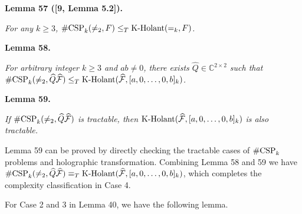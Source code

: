 

\par\medskip\noindent\textbf{
\textbf{Lemma 57}\textbf{ }([9, Lemma 5.2])\textbf{.}
}\par



\emph{For any $k\geq 3$, $\textup{{\#CSP}}_{k}(\neq_{2},F)\leq_{T}\textup{{K-Holant}}(=_{k},F)$.}\par







\par\medskip\noindent\textbf{
\textbf{Lemma 58}\textbf{.}
}\par



\emph{For arbitrary integer $k\geq 3$ and $ab\neq 0$, there exists $\widehat{Q}\in\mathbb{C}^{2\times 2}$ such that $\textup{{\#CSP}}_{k}(\neq_{2},\widehat{Q}\widehat{\mathcal{F}})\leq_{T}\textup{{K-Holant}}(\widehat{\mathcal{F}},[a,0,\dots,0,b]_{k})$.}\par







\par\medskip\noindent\textbf{
\textbf{Lemma 59}\textbf{.}
}\par



\emph{If $\textup{{\#CSP}}_{k}(\neq_{2},\widehat{Q}\widehat{\mathcal{F}})$ is tractable, then $\textup{{K-Holant}}(\widehat{\mathcal{F}},[a,0,\dots,0,b]_{k})$ is also tractable.}\par






Lemma 59 can be proved by directly checking the tractable cases of $\textup{{\#CSP}}_{k}$ problems and holographic transformation. Combining Lemma 58 and 59 we have $\textup{{\#CSP}}_{k}(\neq_{2},\widehat{Q}\widehat{\mathcal{F}})\equiv_{T}\textup{{K-Holant}}(\widehat{\mathcal{F}},[a,0,\dots,0,b]_{k})$, which completes the complexity classification in Case 4.\par




For Case 2 and 3 in Lemma 40, we have the following lemma.\par



